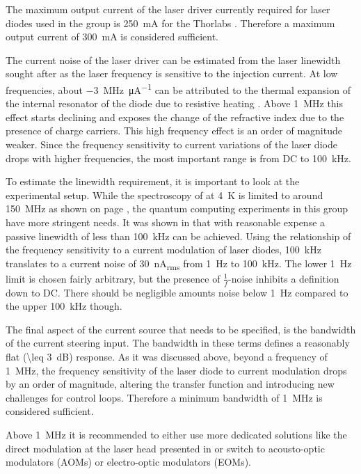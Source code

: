 The maximum output current of the laser driver currently required for laser diodes used in the group is \qty{250}{\mA} for the Thorlabs  \cite{datasheet_thorlabs_780nm}. Therefore a maximum output current of \qty{300}{\mA} is considered sufficient.

The current noise of the laser driver can be estimated from the laser linewidth sought after as the laser frequency is sensitive to the injection current. At low frequencies, about \qty[per-mode=symbol]{-3}{\MHz \per \micro \A} can be attributed to the thermal expansion of the internal resonator of the diode due to resistive heating \cite{diodelaser_modulation}. Above \qty{1}{\MHz} this effect starts declining and exposes the change of the refractive index due to the presence of charge carriers. This high frequency effect is an order of magnitude weaker. Since the frequency sensitivity to current variations of the laser diode drops with higher frequencies, the most important range is from DC to \qty{100}{\kHz}.

To estimate the linewidth requirement, it is important to look at the experimental setup. While the spectroscopy of  at \qty{4}{\K} is limited to around \qty{150}{\MHz}  as shown on page \pageref{eqn:doppler_broadening}, the quantum computing experiments in this group have more stringent needs. It was shown in \cite{ecdl_stability, ecdl_silicone_housing,ecdl_linewidth_scholten} that with reasonable expense a passive linewidth of less than \qty{100}{\kHz} can be achieved. Using the relationship of the frequency sensitivity to a current modulation of laser diodes, \qty{100}{\kHz} translates to a current noise of \qty{30}{\nA_{rms}} from \qty{1}{\Hz} to \qty{100}{\kHz}. The lower \qty{1}{\Hz} limit is chosen fairly arbitrary, but the presence of $\frac 1 f$-noise inhibits a definition down to DC. There should be negligible amounts noise below \qty{1}{\Hz} compared to the upper \qty{100}{\kHz} though.

The final aspect of the current source that needs to be specified, is the bandwidth of the current steering input. The bandwidth in these terms defines a reasonably flat (\qty{\leq 3}{\dB}) response. As it was discussed above, beyond a frequency of \qty{1}{\MHz}, the frequency sensitivity of the laser diode to current modulation drops by an order of magnitude, altering the transfer function and introducing new challenges for control loops. Therefore a minimum bandwidth of \qty{1}{\MHz} is considered sufficient.

Above \qty{1}{\MHz} it is recommended to either use more dedicated solutions like the direct modulation at the laser head presented in \cite{current_mod_paper} or switch to acousto-optic modulators (AOMs) or electro-optic modulators (EOMs).

